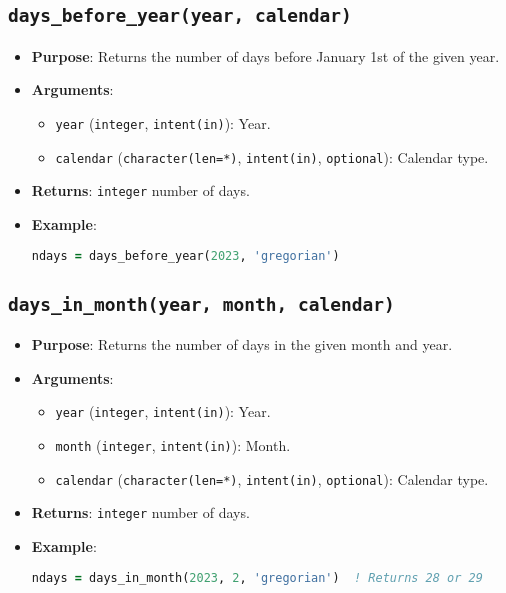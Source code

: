 \documentclass[12pt,a4paper]{report}
\begin{document}
\subsection{\texttt{days\_before\_year(year, calendar)}}
\begin{itemize}
\item \textbf{Purpose}: Returns the number of days before January 1st of the given year.
\item \textbf{Arguments}:
\begin{itemize}
\item \texttt{year} (\texttt{integer}, \texttt{intent(in)}): Year.
\item \texttt{calendar} (\texttt{character(len=*)}, \texttt{intent(in)}, \texttt{optional}): Calendar type.
\end{itemize}
\item \textbf{Returns}: \texttt{integer} number of days.
\item \textbf{Example}:
\begin{lstlisting}[language=Fortran]
ndays = days_before_year(2023, 'gregorian')
\end{lstlisting}
\end{itemize}

\subsection{\texttt{days\_in\_month(year, month, calendar)}}
\begin{itemize}
\item \textbf{Purpose}: Returns the number of days in the given month and year.
\item \textbf{Arguments}:
\begin{itemize}
\item \texttt{year} (\texttt{integer}, \texttt{intent(in)}): Year.
\item \texttt{month} (\texttt{integer}, \texttt{intent(in)}): Month.
\item \texttt{calendar} (\texttt{character(len=*)}, \texttt{intent(in)}, \texttt{optional}): Calendar type.
\end{itemize}
\item \textbf{Returns}: \texttt{integer} number of days.
\item \textbf{Example}:
\begin{lstlisting}[language=Fortran]
ndays = days_in_month(2023, 2, 'gregorian')  ! Returns 28 or 29
\end{lstlisting}
\end{itemize}
\end{document}
